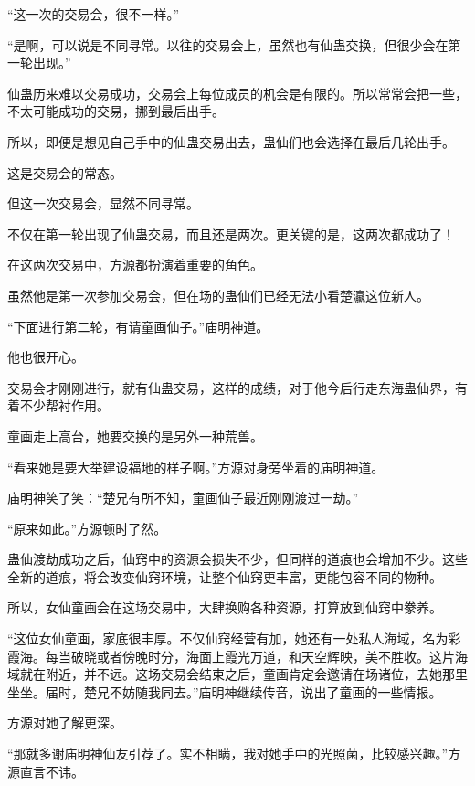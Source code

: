 
\begin{this_body}



“这一次的交易会，很不一样。”

“是啊，可以说是不同寻常。以往的交易会上，虽然也有仙蛊交换，但很少会在第一轮出现。”

仙蛊历来难以交易成功，交易会上每位成员的机会是有限的。所以常常会把一些，不太可能成功的交易，挪到最后出手。

所以，即便是想见自己手中的仙蛊交易出去，蛊仙们也会选择在最后几轮出手。

这是交易会的常态。

但这一次交易会，显然不同寻常。

不仅在第一轮出现了仙蛊交易，而且还是两次。更关键的是，这两次都成功了！

在这两次交易中，方源都扮演着重要的角色。

虽然他是第一次参加交易会，但在场的蛊仙们已经无法小看楚瀛这位新人。

“下面进行第二轮，有请童画仙子。”庙明神道。

他也很开心。

交易会才刚刚进行，就有仙蛊交易，这样的成绩，对于他今后行走东海蛊仙界，有着不少帮衬作用。

童画走上高台，她要交换的是另外一种荒兽。

“看来她是要大举建设福地的样子啊。”方源对身旁坐着的庙明神道。

庙明神笑了笑：“楚兄有所不知，童画仙子最近刚刚渡过一劫。”

“原来如此。”方源顿时了然。

蛊仙渡劫成功之后，仙窍中的资源会损失不少，但同样的道痕也会增加不少。这些全新的道痕，将会改变仙窍环境，让整个仙窍更丰富，更能包容不同的物种。

所以，女仙童画会在这场交易中，大肆换购各种资源，打算放到仙窍中豢养。

“这位女仙童画，家底很丰厚。不仅仙窍经营有加，她还有一处私人海域，名为彩霞海。每当破晓或者傍晚时分，海面上霞光万道，和天空辉映，美不胜收。这片海域就在附近，并不远。这场交易会结束之后，童画肯定会邀请在场诸位，去她那里坐坐。届时，楚兄不妨随我同去。”庙明神继续传音，说出了童画的一些情报。

方源对她了解更深。

“那就多谢庙明神仙友引荐了。实不相瞒，我对她手中的光照菌，比较感兴趣。”方源直言不讳。


\end{this_body}
